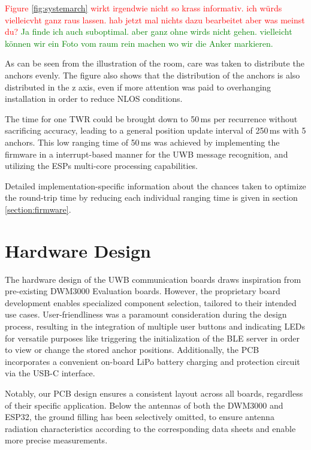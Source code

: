 \documentclass[conference, a4paper]{IEEEtran}
\begin{document}
\textcolor{red}{Figure \ref{fig:systemarch} wirkt irgendwie nicht so krass informativ. ich würds vielleicvht ganz raus lassen. hab jetzt mal nichts dazu bearbeitet aber was meinst du?}
\textcolor{green}{Ja finde ich auch suboptimal. aber ganz ohne wirds nicht gehen. vielleicht können wir ein Foto vom raum rein machen wo wir die Anker markieren.}

As can be seen from the illustration of the room, care was taken to distribute the anchors evenly.
The figure also shows that the distribution of the anchors is also distributed in the z axis, even if more attention was paid to overhanging installation in order to reduce \ac{NLOS} conditions.

The time for one \ac{TWR} could be brought down to 50\,ms per recurrence without sacrificing accuracy,
leading to a general position update interval of 250\,ms with 5 anchors. 
This low ranging time of 50\,ms was achieved by implementing the firmware in a interrupt-based manner for the \ac{UWB} message recognition, and utilizing the ESPs multi-core processing capabilities.

Detailed implementation-specific information about the chances taken to optimize the round-trip time by reducing each individual ranging time
is given in section \ref{section:firmware}.


\section{Hardware Design}\label{section:hardware}
The hardware design of the \ac{UWB} communication boards draws inspiration from pre-existing DWM3000 Evaluation
boards.
However, the proprietary board development enables specialized component selection, tailored to their intended use cases.
User-friendliness was a paramount consideration during the design process,
resulting in the integration of multiple user buttons and indicating LEDs for versatile purposes like triggering the initialization of the \ac{BLE} server in order to view or change the stored anchor positions. 
Additionally, the PCB incorporates a convenient on-board LiPo battery charging and protection circuit via the USB-C interface.

Notably, our PCB design ensures a consistent layout across all boards, regardless of their specific application.
Below the antennas of both the DWM3000 and ESP32, the ground filling has been selectively omitted, to ensure antenna radiation characteristics according to the corresponding data sheets and enable more precise measurements.
\end{document}
